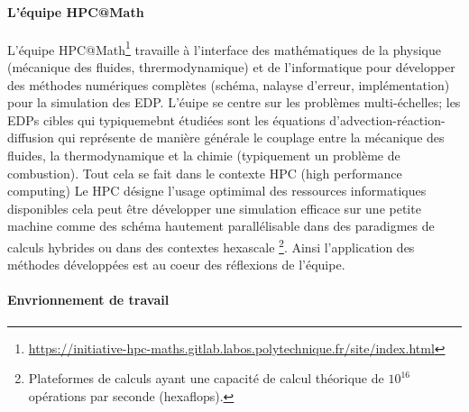 \paragraph{L'équipe HPC@Math}
    L'équipe HPC@Math\footnote{\href{https://initiative-hpc-maths.gitlab.labos.polytechnique.fr/site/index.html}{https://initiative-hpc-maths.gitlab.labos.polytechnique.fr/site/index.html}} travaille à l'interface des mathématiques de la physique (mécanique des fluides, thrermodynamique) et de l'informatique pour développer 
    des méthodes numériques complètes (schéma, nalayse d'erreur, implémentation) pour la simulation des EDP. 
    L'éuipe se centre sur les problèmes multi-échelles; les EDPs cibles qui typiquemebnt étudiées sont les équations d'advection-réaction-diffusion qui représente 
    de manière générale le couplage entre la mécanique des fluides, la thermodynamique et la chimie (typiquement un problème de combustion).
    Tout cela se fait dans le contexte HPC (high performance computing) Le HPC désigne l'usage optimimal des ressources informatiques disponibles
    cela peut être développer une simulation efficace sur une petite machine comme des schéma hautement parallélisable 
    dans des paradigmes de calculs hybrides ou dans des contextes hexascale
    \footnote{Plateformes de calculs ayant une capacité de calcul théorique de $10^{16}$ opérations par seconde (hexaflops).}. 
    Ainsi l'application des méthodes développées
    est au coeur des réflexions de l'équipe. 
\paragraph{Envrionnement de travail}
